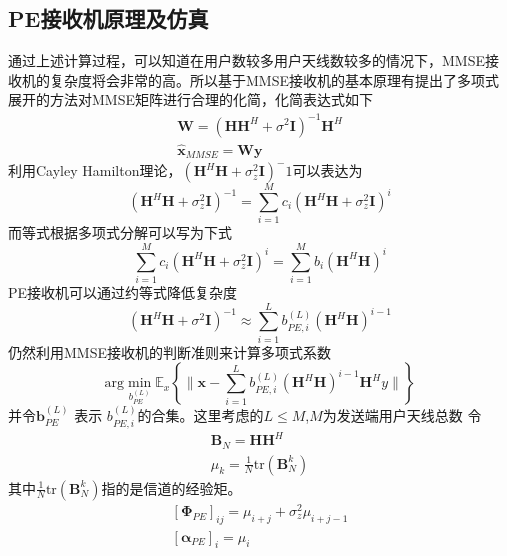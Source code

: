 \documentclass[bachelor,nocolorlinks, printoneside]{seuthesis} %
\begin{document}
\begin{Main}
\section{PE接收机原理及仿真}
通过上述计算过程，可以知道在用户数较多用户天线数较多的情况下，MMSE接收机的复杂度将会非常的高\cite{LuAnAn}。所以基于MMSE接收机的基本原理有提出了多项式展开的方法对MMSE矩阵进行合理的化简，化简表达式如下
\begin{gather}\label{key}
\mathbf{W} = (\mathbf{H}\mathbf{H}^H + \sigma^2 \mathbf{I})^{-1}\mathbf{H}^H  \nonumber \\
\hat{\mathbf{x}}_{MMSE} = \mathbf{W} \mathbf{y}  
\end{gather}
利用Cayley Hamilton理论，$(\mathbf{H}^H\mathbf{H}+\sigma_z^2\mathbf{I})^-1$可以表达为
\begin{equation}\label{key}
(\mathbf{H}^H\mathbf{H}+\sigma^2_z\mathbf{I})^{-1} = \sum_{i=1}^M c_i(\mathbf{H}^H \mathbf{H}+\sigma^2_z\mathbf{I})^i
\end{equation}
而等式根据多项式分解可以写为下式
\begin{equation}\label{key}
\sum_{i=1}^M c_i(\mathbf{H}^H \mathbf{H}+\sigma^2_z\mathbf{I})^i=\sum_{i=1}^M b_i(\mathbf{H}^H\mathbf{H})^i
\end{equation}
PE接收机可以通过约等式降低复杂度
\begin{equation}\label{key}
(\mathbf{H}^H\mathbf{H}+\sigma^2\mathbf{I})^{-1} \approx \sum_{i=1}^{L} b_{PE,i}^{(L)}(\mathbf{H}^H\mathbf{H})^{i-1}
\end{equation}
仍然利用MMSE接收机的判断准则来计算多项式系数
\begin{equation}\label{key}
\mathrm{arg} \min_{b_{PE}^{(L)}} \mathbb{E}_x \left\lbrace \| \mathbf{x}-\sum_{i=1}^{L}b_{PE,i}^{(L)}(\mathbf{H}^H\mathbf{H})^{i-1}\mathbf{H}^Hy \| \right\rbrace
\end{equation}
并令$\mathbf{b}^{(L)}_{PE}$ 表示 $b_{PE,i}^{(L)}$的合集。这里考虑的$L \leq M$,$M$为发送端用户天线总数
令
\begin{gather}\label{key}
\mathbf{B}_N = \mathbf{H}\mathbf{H}^H \nonumber \\
\mu_k = \frac{1}{N} \mathrm{tr}(\mathbf{B}_N^k) \nonumber
\end{gather}
其中$\frac{1}{N} \mathrm{tr}(\mathbf{B}_N^k)$指的是信道的经验矩。
\begin{gather}\label{key}
[\mathbf{\Phi}_{PE}]_{ij} = \mu_{i+j} + \sigma_{z}^2 \mu_{i+j-1} \nonumber \\
\left[\mathbf{\alpha}_{PE}\right]_i = \mu_i
\end{gather}


\end{Main}
\end{document}
